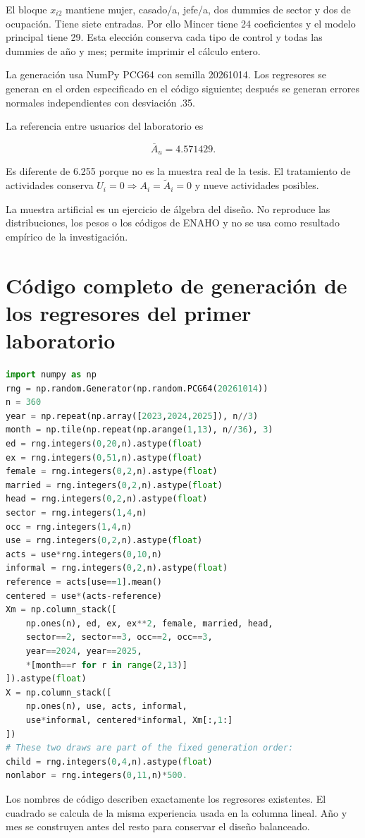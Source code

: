 \documentclass[11pt,a4paper]{article}
\begin{document}
El bloque $x_{i2}$ mantiene mujer, casado/a, jefe/a, dos dummies de sector y dos de ocupación. Tiene siete entradas. Por ello Mincer tiene 24 coeficientes y el modelo principal tiene 29. Esta elección conserva cada tipo de control y todas las dummies de año y mes; permite imprimir el cálculo entero.

La generación usa NumPy PCG64 con semilla 20261014. Los regresores se generan en el orden especificado en el código siguiente; después se generan errores normales independientes con desviación .35.

La referencia entre usuarios del laboratorio es

\[
\overline A_u=4.571429.
\]

Es diferente de 6.255 porque no es la muestra real de la tesis. El tratamiento de actividades conserva $U_i=0\Rightarrow A_i=\widetilde A_i=0$ y nueve actividades posibles.

La muestra artificial es un ejercicio de álgebra del diseño. No reproduce las distribuciones, los pesos o los códigos de ENAHO y no se usa como resultado empírico de la investigación.

\clearpage
\section{Código completo de generación de los regresores del primer laboratorio}

\begin{lstlisting}[language=Python]
import numpy as np
rng = np.random.Generator(np.random.PCG64(20261014))
n = 360
year = np.repeat(np.array([2023,2024,2025]), n//3)
month = np.tile(np.repeat(np.arange(1,13), n//36), 3)
ed = rng.integers(0,20,n).astype(float)
ex = rng.integers(0,51,n).astype(float)
female = rng.integers(0,2,n).astype(float)
married = rng.integers(0,2,n).astype(float)
head = rng.integers(0,2,n).astype(float)
sector = rng.integers(1,4,n)
occ = rng.integers(1,4,n)
use = rng.integers(0,2,n).astype(float)
acts = use*rng.integers(0,10,n)
informal = rng.integers(0,2,n).astype(float)
reference = acts[use==1].mean()
centered = use*(acts-reference)
Xm = np.column_stack([
    np.ones(n), ed, ex, ex**2, female, married, head,
    sector==2, sector==3, occ==2, occ==3,
    year==2024, year==2025,
    *[month==r for r in range(2,13)]
]).astype(float)
X = np.column_stack([
    np.ones(n), use, acts, informal,
    use*informal, centered*informal, Xm[:,1:]
])
# These two draws are part of the fixed generation order:
child = rng.integers(0,4,n).astype(float)
nonlabor = rng.integers(0,11,n)*500.
\end{lstlisting}
Los nombres de código describen exactamente los regresores existentes. El cuadrado se calcula de la misma experiencia usada en la columna lineal. Año y mes se construyen antes del resto para conservar el diseño balanceado.
\end{document}
